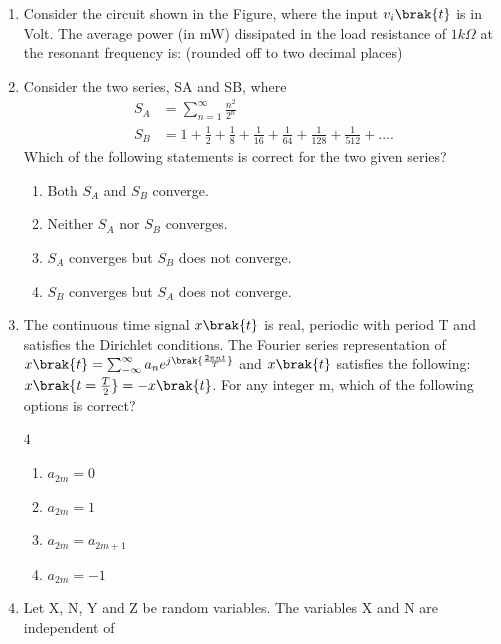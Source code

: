\begin{enumerate}[label=\thesubsection.\arabic*,ref=\thesubsection.\theenumi]
\item Consider the circuit shown in the Figure, where the input $v_i \brak{t}$ is in Volt.
The average power (in mW) dissipated in the load resistance of $1 k\Omega$ at the
resonant frequency is:
(rounded off to two decimal places)
\item Consider the two series, SA and SB, where
	\begin{align*}
		S_A&=\sum_{n=1}^\infty \frac{n^2}{2^n}\\
		S_B&=1+\frac{1}{2}+\frac{1}{8}+\frac{1}{16}+\frac{1}{64}+\frac{1}{128}+\frac{1}{512}+....
	\end{align*}
Which of the following statements is correct for the two given series?
\begin{enumerate}
	\item Both $S_A$ and $S_B$ converge.
	\item Neither $S_A$ nor $S_B$ converges.
	\item $S_A$ converges but $S_B$ does not converge.
	\item $S_B$ converges but $S_A$ does not converge.
\end{enumerate}
\item The continuous time signal $x\brak{t}$ is real, periodic with period T and satisfies the
Dirichlet conditions.
The Fourier series representation of $x\brak{t} = \sum_{-\infty}^\infty a_ne^{j\brak{\frac{2\pi n t}{T}}}$
and $x\brak{t}$ satisfies the following:$x\brak{t=\frac{T}{2}}=-x\brak{t}$. For any integer m, which of the following options is correct? 
\begin{multicols}{4}
	\begin{enumerate}
		\item $a_{2m}=0$
		\item $a_{2m}=1$
		\item $a_{2m}=a_{2m+1}$
		\item $a_{2m}=-1$
	\end{enumerate}
\end{multicols}
\item Let X, N, Y and Z be random variables. The variables X and N are independent of

\end{enumerate}
